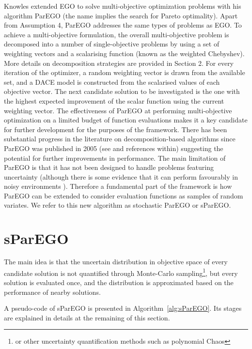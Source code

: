 \documentclass[10pt]{llncs}
\begin{document}
Knowles \cite{Knowles200650} extended EGO to solve multi-objective optimization problems with his algorithm ParEGO (the name implies the search for Pareto optimality). Apart from Assumption 4, ParEGO addresses the same types of problems as EGO. To achieve a multi-objective formulation, the overall multi-objective problem is decomposed into a number of single-objective problems by using a set of weighting vectors and a scalarising function (known as the weighted Chebyshev).
More details on decomposition strategies are provided in Section 2. For every iteration of the optimizer, a random weighting vector is drawn from the available set, and a DACE model is constructed from the scalarised values of each objective vector. The next candidate solution to be investigated is the one with the highest expected improvement of the scalar function using the current weighting vector.
The effectiveness of ParEGO at performing multi-objective optimization on a limited budget of function evaluations makes it a key candidate for further development for the purposes of the framework. There has been substantial progress in the literature on decomposition-based algorithms since ParEGO was published in 2005 (see \cite{giagkiozis2015overview} and references within) suggesting the potential for further improvements in performance. The main limitation of ParEGO is that it has not been designed to handle problems featuring uncertainty (although there is some evidence that it can perform favourably in noisy environments \cite{knowles2009noisy}). Therefore a fundamental part of the framework is how ParEGO can be extended to consider evaluation functions as samples of random variates. We refer to this new algorithm as stochastic ParEGO or sParEGO.

\section{sParEGO}
The main idea is that the uncertain distribution in objective space of every candidate solution is not quantified through Monte-Carlo sampling\footnote{or other uncertainty quantification methods such as polynomial Chaos}, but every solution is evaluated once, and the distribution is approximated based on the performance of nearby solutions.

A pseudo-code of sParEGO is presented in Algorithm~\ref{alg:sParEGO}.
Its stages are explained in details at the remaining of this section.
\end{document}
